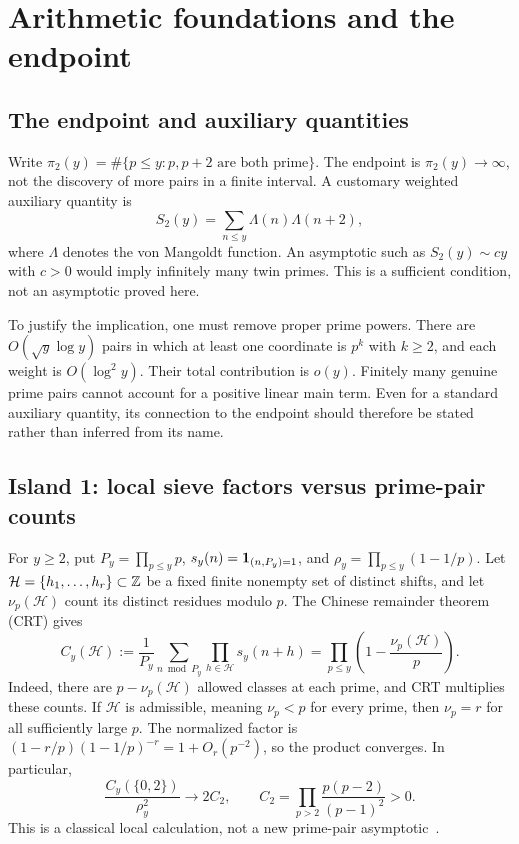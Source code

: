 \section{Arithmetic foundations and the endpoint}\label{sec:arithmetic}
\subsection{The endpoint and auxiliary quantities}
Write $\pi_2(y)=\#\{p\le y:p,p+2\text{ are both prime}\}$. The endpoint is $\pi_2(y)\to\infty$, not the discovery of more pairs in a finite interval. A customary weighted auxiliary quantity is
\[
S_2(y)=\sum_{n\le y}\Lambda(n)\Lambda(n+2),
\]
where $\Lambda$ denotes the von Mangoldt function. An asymptotic such as $S_2(y)\sim cy$ with $c>0$ would imply infinitely many twin primes. This is a sufficient condition, not an asymptotic proved here.

To justify the implication, one must remove proper prime powers. There are $O(\sqrt y\log y)$ pairs in which at least one coordinate is $p^k$ with $k\ge2$, and each weight is $O(\log^2y)$. Their total contribution is $o(y)$. Finitely many genuine prime pairs cannot account for a positive linear main term. Even for a standard auxiliary quantity, its connection to the endpoint should therefore be stated rather than inferred from its name.

\subsection{Island 1: local sieve factors versus prime-pair counts}
For $y\ge2$, put $P_y=\prod_{p\le y}p$, $s_y(n)=\mathbf 1_{(n,P_y)=1}$, and $\rho_y=\prod_{p\le y}(1-1/p)$. Let $\mathcal H=\{h_1,\ldots,h_r\}\subset\mathbb Z$ be a fixed finite nonempty set of distinct shifts, and let $\nu_p(\mathcal H)$ count its distinct residues modulo $p$. The Chinese remainder theorem (CRT) gives
\[
C_y(\mathcal H):=\frac1{P_y}\sum_{n\bmod P_y}\prod_{h\in\mathcal H}s_y(n+h)
=\prod_{p\le y}\left(1-\frac{\nu_p(\mathcal H)}p\right).
\]
Indeed, there are $p-\nu_p(\mathcal H)$ allowed classes at each prime, and CRT multiplies these counts. If $\mathcal H$ is admissible, meaning $\nu_p<p$ for every prime, then $\nu_p=r$ for all sufficiently large $p$. The normalized factor is $(1-r/p)(1-1/p)^{-r}=1+O_r(p^{-2})$, so the product converges. In particular,
\[
\frac{C_y(\{0,2\})}{\rho_y^2}\longrightarrow2C_2,\qquad
C_2=\prod_{p>2}\frac{p(p-2)}{(p-1)^2}>0.
\]
This is a classical local calculation, not a new prime-pair asymptotic~\cite{archive1}.

